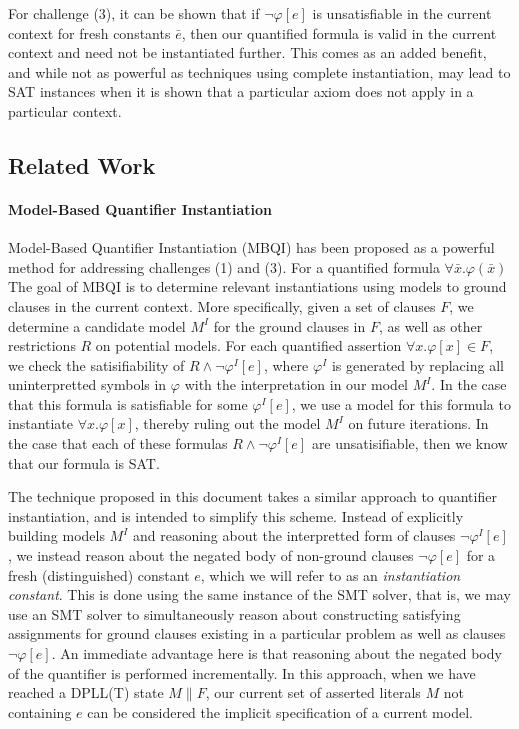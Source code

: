\documentclass{llncs}
\begin{document}
For challenge (3), it can be shown that if $\neg \varphi[e]$ is unsatisfiable in the current context for fresh constants $\bar{e}$, then our quantified formula is valid in the current context and need not be instantiated further.
This comes as an added benefit, and while not as powerful as techniques using complete instantiation, may lead to SAT instances when it is shown that a particular axiom does not apply in a particular context.

\subsection{Related Work}

\paragraph{Model-Based Quantifier Instantiation}
Model-Based Quantifier Instantiation (MBQI) has been proposed as a powerful method for addressing challenges (1) and (3).
For a quantified formula $\forall \bar{x}. \varphi(\bar{x})$
The goal of MBQI is to determine relevant instantiations using models to ground clauses in the current context.
More specifically, given a set of clauses $F$, we determine a candidate model $M^I$ for the ground clauses in $F$, as well as other restrictions $R$ on potential models.
For each quantified assertion $\forall x. \varphi[x] \in F$, we check the satisifiability of $R \wedge \neg \varphi^I[e]$, where $\varphi^I$ is generated by replacing all uninterpretted symbols in $\varphi$ with the interpretation in our model $M^I$.
In the case that this formula is satisfiable for some $\varphi^I[e]$, we use a model for this formula to instantiate $\forall x. \varphi[x]$, thereby ruling out the model $M^I$ on future iterations.
In the case that each of these formulas $R \wedge \neg \varphi^I[e]$ are unsatisifiable, then we know that our formula is SAT.


The technique proposed in this document takes a similar approach to quantifier instantiation, and is intended to simplify this scheme.
Instead of explicitly building models $M^I$ and reasoning about the interpretted form of clauses $\neg \varphi^I[e]$, we instead reason  about the negated body of non-ground clauses $\neg \varphi[e]$ for a fresh (distinguished) constant $e$, which we will refer to as an \emph{instantiation constant}.
This is done using the same instance of the SMT solver, that is, we may use an SMT solver to simultaneously reason about constructing satisfying assignments for ground clauses existing in a particular problem as well as clauses $\neg \varphi[e]$.
An immediate advantage here is that reasoning about the negated body of the quantifier is performed incrementally.
In this approach, when we have reached a DPLL(T) state $M \parallel F$, our current set of asserted literals $M$ not containing $e$ can be considered the implicit specification of a current model.
\end{document}
